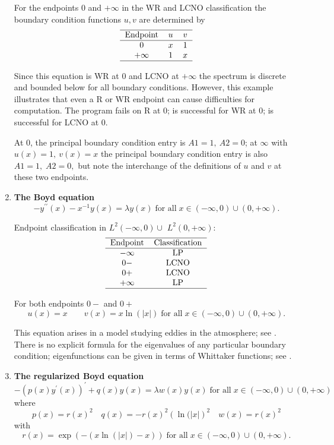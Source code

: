 \documentclass[12pt]{amsart}%
\theoremstyle{plain}
\numberwithin{equation}{section}
\begin{document}
\begin{enumerate}
For the endpoints $0$ and $+\infty$ in the WR and LCNO classification the
boundary condition functions $u,v$ are determined by%
\[%
\begin{tabular}
[c]{ccc}\hline
Endpoint & $u$ & $v$\\\hline
$0$ & $x$ & $1$\\
$+\infty$ & $1$ & $x$\\\hline
\end{tabular}
\]

Since this equation is WR at $0$ and LCNO at $+\infty$ the spectrum is
discrete and bounded below for all boundary conditions. However, this example
illustrates that even a R or WR endpoint can cause difficulties for
computation. The program fails on R at $0$; is successful for WR at $0$; is
successful for LCNO at $0.$

At $0$, the principal boundary condition entry is $A1=1,\ A2=0$; at $\infty$
with $u(x)=1,\ v(x)=x$ the principal boundary condition entry is also
$A1=1,\;A2=0,$ but note the interchange of the definitions of $u$ and $v$ at
these two endpoints.

\item \textbf{The Boyd equation}%
\[
-y^{\prime\prime}(x)-x^{-1}y(x)=\lambda y(x)\;\text{for all}\;x\in
(-\infty,0)\cup(0,+\infty).
\]

Endpoint classification in $L^{2}(-\infty,0)\cup$ $L^{2}(0,+\infty)$:%
\[%
\begin{tabular}
[c]{cc}\hline
Endpoint & Classification\\\hline
$-\infty$ & LP\\
$0-$ & LCNO\\
$0+$ & LCNO\\
$+\infty$ & LP\\\hline
\end{tabular}
\]

For both endpoints $0-$ and $0+$%
\[
u(x)=x\quad\quad v(x)=x\ln(\left|  x\right|  )\;\text{for all}\;x\in
(-\infty,0)\cup(0,+\infty).
\]

This equation arises in a model studying eddies in the atmosphere; see
\cite{B}. There is no explicit formula for the eigenvalues of any particular
boundary condition; eigenfunctions can be given in terms of Whittaker
functions; see \cite[Example 3]{BEZ}.

\item \textbf{The regularized Boyd equation}%
\[
-(p(x)y^{\prime}(x))^{\prime}+q(x)y(x)=\lambda w(x)y(x)\;\text{for all}%
\;x\in(-\infty,0)\cup(0,+\infty)
\]
where%
\[
p(x)=r(x)^{2}\quad q(x)=-r(x)^{2}\left(  \ln(\left|  x\right|  \right)
^{2}\quad w(x)=r(x)^{2}%
\]
with%
\[
r(x)=\exp\left(  -(x\ln(\left|  x\right|  )-x)\right)  \;\text{for all}%
\;x\in(-\infty,0)\cup(0,+\infty).
\]


\end{enumerate}
\end{document}
